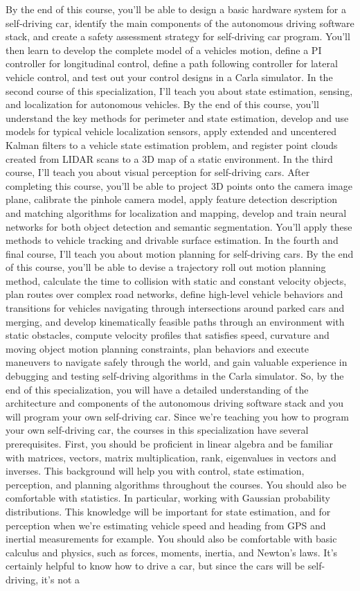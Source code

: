 By the end of this course, you'll be able to design a basic hardware system for a self-driving car, identify the main components of the autonomous driving software stack, and create a safety assessment strategy for self-driving car program. You'll then learn to develop the complete model of a vehicles motion, define a PI controller for longitudinal control, define a path following controller for lateral vehicle control, and test out your control designs in a Carla simulator. In the second course of this specialization, I'll teach you about state estimation, sensing, and localization for autonomous vehicles. By the end of this course, you'll understand the key methods for perimeter and state estimation, develop and use models for typical vehicle localization sensors, apply extended and uncentered Kalman filters to a vehicle state estimation problem, and register point clouds created from LIDAR scans to a 3D map of a static environment. In the third course, I'll teach you about visual perception for self-driving cars. After completing this course, you'll be able to project 3D points onto the camera image plane, calibrate the pinhole camera model, apply feature detection description and matching algorithms for localization and mapping, develop and train neural networks for both object detection and semantic segmentation. You'll apply these methods to vehicle tracking and drivable surface estimation. In the fourth and final course, I'll teach you about motion planning for self-driving cars. By the end of this course, you'll be able to devise a trajectory roll out motion planning method, calculate the time to collision with static and constant velocity objects, plan routes over complex road networks, define high-level vehicle behaviors and transitions for vehicles navigating through intersections around parked cars and merging, and develop kinematically feasible paths through an environment with static obstacles, compute velocity profiles that satisfies speed, curvature and moving object motion planning constraints, plan behaviors and execute maneuvers to navigate safely through the world, and gain valuable experience in debugging and testing self-driving algorithms in the Carla simulator. So, by the end of this specialization, you will have a detailed understanding of the architecture and components of the autonomous driving software stack and you will program your own self-driving car. Since we're teaching you how to program your own self-driving car, the courses in this specialization have several prerequisites. First, you should be proficient in linear algebra and be familiar with matrices, vectors, matrix multiplication, rank, eigenvalues in vectors and inverses. This background will help you with control, state estimation, perception, and planning algorithms throughout the courses. You should also be comfortable with statistics. In particular, working with Gaussian probability distributions. This knowledge will be important for state estimation, and for perception when we're estimating vehicle speed and heading from GPS and inertial measurements for example. You should also be comfortable with basic calculus and physics, such as forces, moments, inertia, and Newton's laws. It's certainly helpful to know how to drive a car, but since the cars will be self-driving, it's not a 